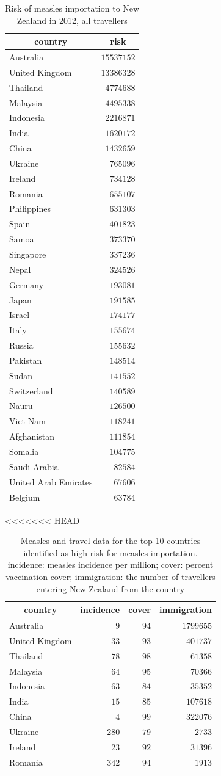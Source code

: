 \documentclass{article}
\begin{document}
\begin{itemize}
\begin{table}
\caption{Risk of measles importation to New Zealand in 2012, all travellers}
\begin{center}
\begin{tabular}{lr}
\hline\hline
\multicolumn{1}{c}{country}&\multicolumn{1}{c}{risk}\tabularnewline
\hline
Australia&$15537152$\tabularnewline
United Kingdom&$13386328$\tabularnewline
Thailand&$ 4774688$\tabularnewline
Malaysia&$ 4495338$\tabularnewline
Indonesia&$ 2216871$\tabularnewline
India&$ 1620172$\tabularnewline
China&$ 1432659$\tabularnewline
Ukraine&$  765096$\tabularnewline
Ireland&$  734128$\tabularnewline
Romania&$  655107$\tabularnewline
Philippines&$  631303$\tabularnewline
Spain&$  401823$\tabularnewline
Samoa&$  373370$\tabularnewline
Singapore&$  337236$\tabularnewline
Nepal&$  324526$\tabularnewline
Germany&$  193081$\tabularnewline
Japan&$  191585$\tabularnewline
Israel&$  174177$\tabularnewline
Italy&$  155674$\tabularnewline
Russia&$  155632$\tabularnewline
Pakistan&$  148514$\tabularnewline
Sudan&$  141552$\tabularnewline
Switzerland&$  140589$\tabularnewline
Nauru&$  126500$\tabularnewline
Viet Nam&$  118241$\tabularnewline
Afghanistan&$  111854$\tabularnewline
Somalia&$  104775$\tabularnewline
Saudi Arabia&$   82584$\tabularnewline
United Arab Emirates&$   67606$\tabularnewline
Belgium&$   63784$\tabularnewline
\hline
\end{tabular}\end{center}\label{table:risk12}
\end{table}


<<<<<<< HEAD

\begin{table}
\caption{Measles and travel data for the top 10 countries identified as high risk for measles importation. incidence: measles incidence per million; cover: percent vaccination cover; immigration: the number of travellers entering New Zealand from the country}
\begin{center}
\begin{tabular}{lrrr}
\hline\hline
\multicolumn{1}{c}{country}&\multicolumn{1}{c}{incidence}&\multicolumn{1}{c}{cover}&\multicolumn{1}{c}{immigration}\tabularnewline
\hline
Australia&$  9$&$94$&$1799655$\tabularnewline
United Kingdom&$ 33$&$93$&$ 401737$\tabularnewline
Thailand&$ 78$&$98$&$  61358$\tabularnewline
Malaysia&$ 64$&$95$&$  70366$\tabularnewline
Indonesia&$ 63$&$84$&$  35352$\tabularnewline
India&$ 15$&$85$&$ 107618$\tabularnewline
China&$  4$&$99$&$ 322076$\tabularnewline
Ukraine&$280$&$79$&$   2733$\tabularnewline
Ireland&$ 23$&$92$&$  31396$\tabularnewline
Romania&$342$&$94$&$   1913$\tabularnewline
\hline
\end{tabular}\end{center}\label{table:toprisk}
\end{table}




\end{itemize}
\end{document}
